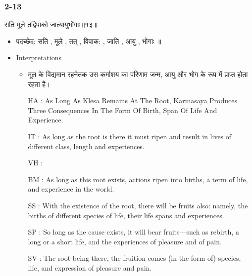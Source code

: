 \begin{frame}[fragile]\frametitle{2-13}
\begin{sanskrit}
सति मूले तद्विपाको जात्यायुर्भोगाः॥१३॥
\end{sanskrit}

	\begin{itemize}
	\item पदच्छेद: सति , मूले , तत् , विपाक: , जाति , आयु , भोगाः ॥
	\item Interpretations
		\begin{itemize}
		\item मूल के विद्यमान रहनेतक उस कर्माशय का परिणाम जन्म, आयु और भोग के रूप में प्राप्त होता रहता है।
		\item [HA]: As Long As Klesa Remains At The Root, Karmasaya Produces Three Consequences In The Form Of Birth, Span Of Life And Experience.
		\item [IT]: As long as the root is there it must ripen and result in lives of different class, length and experiences.
		\item [VH]: 
		\item [BM]: As long as this root exists, actions ripen into births, a term of life, and experience in the world.
		\item [SS]: With the existence of the root, there will be fruits also: namely, the births of different species of life, their life spans and experiences.
		\item [SP]: So long as the cause exists, it will bear fruits—such as rebirth, a long or a short life, and the experiences of pleasure and of pain.
		\item [SV]: The root being there, the fruition comes (in the form of) species, life, and expression of pleasure and pain. 
		\end{itemize}
	\end{itemize}
	
\end{frame}



